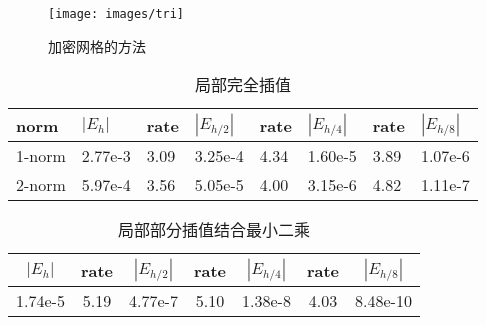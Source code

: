 \begin{figure}[H]
  \centering
  \texttt{[image: images/tri]}
  \caption{加密网格的方法}
\end{figure}
\begin{table}[htbp]
  \begin{center}  
    \begin{tabular}{|l|l|l|l|l|l|l|l|}  
      \hline  
      norm & $|E_h|$ & rate & $|E_{h/2}|$ & rate& $|E_{h/4}|$ &rate &$|E_{h/8}|$ \\
      \hline            
      1-norm & 2.77e-3 & 3.09 & 3.25e-4 & 4.34& 1.60e-5 & 3.89&1.07e-6 \\
      \hline
      2-norm & 5.97e-4 & 3.56 & 5.05e-5 & 4.00& 3.15e-6 & 4.82&1.11e-7 \\
      \hline  
    \end{tabular}  
  \end{center}  
  \caption{局部完全插值}  
\end{table}
\begin{table}[h]
  \centering
  \begin{tabular}{|c|c|c|c|c|c|c|}
    \hline
    $|E_h|$ & rate & $|E_{h/2}|$ & rate& $|E_{h/4}|$&rate&$|E_{h/8}|$\\ 
    \hline
    1.74e-5& 5.19& 4.77e-7& 5.10& 1.38e-8& 4.03& 8.48e-10\\ 
    \hline
  \end{tabular}
  \caption{局部部分插值结合最小二乘}
\end{table}
